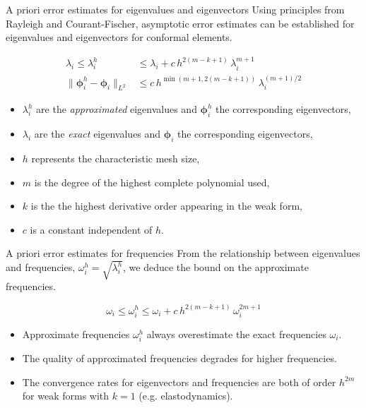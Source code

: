 \documentclass[aspectratio=169]{beamer}
\begin{document}
\begin{frame}{A priori error estimates for eigenvalues and eigenvectors}
  Using principles from Rayleigh and Courant-Fischer, asymptotic error estimates can be established for eigenvalues and eigenvectors for conformal elements.
  \begin{tcolorbox}[colback=darkred!10,colframe=darkred!40!black]
    \vspace{-0.5cm}
    \begin{align*}
      \lambda_i \leq \lambda_i^h                              & \leq \lambda_i + c\, h^{2(m-k+1)}\, \lambda_i^{m+1}    \\
      \| \boldsymbol{\phi}_i^h - \boldsymbol{\phi}_i \|_{L^2} & \leq c\, h^{\min(m+1, 2(m-k+1))}\, \lambda_i^{(m+1)/2}
    \end{align*}
  \end{tcolorbox}
  \begin{itemize}
    \setlength\itemsep{0.5em}
    \item \( \lambda_i^h \) are the \emph{approximated} eigenvalues and \(\boldsymbol \phi_i^h \) the corresponding eigenvectors,
    \item  \( \lambda_i \) are the \emph{exact} eigenvalues and \(\boldsymbol\phi_i \) the corresponding eigenvectors,
    \item \( h \) represents the characteristic mesh size,
    \item \( m \) is the degree of the highest complete polynomial used,
    \item \( k \) is the the highest derivative order appearing in the weak form,
    \item \( c \) is a constant independent of \( h \).
  \end{itemize}
\end{frame}

\begin{frame}{A priori error estimates for frequencies}
  \vspace{-0.3cm}
  From the relationship between eigenvalues and frequencies,  $\omega_i^h=\sqrt{\lambda_i^h}$, we deduce the bound on the approximate frequencies.
  \begin{tcolorbox}[colback=darkred!10,colframe=darkred!40!black]
    $$ \omega_i \leq \omega_i^h \leq \omega_i + c\, h^{2(m-k+1)}\, \omega_i^{2m+1}$$
  \end{tcolorbox}
  \begin{itemize}
    \setlength\itemsep{0.5em}
    \item {Approximate frequencies $\omega_i^h$ always overestimate the exact frequencies $\omega_i$.}
    \item {The quality of approximated frequencies degrades for higher frequencies.}
    \item The convergence rates for eigenvectors and frequencies are both of order \( h^{2m} \) for weak forms with \( k=1 \) (e.g. elastodynamics).
  \end{itemize}
\end{frame}
\end{document}
